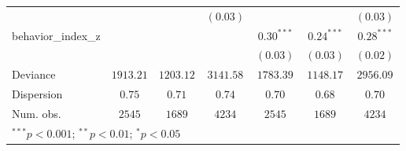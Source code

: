 \begin{tabular}{l c c c c c c}
                       &               &              & $(0.03)$      &               &              & $(0.03)$      \\
behavior\_index\_z     &               &              &               & $0.30^{***}$  & $0.24^{***}$ & $0.28^{***}$  \\
                       &               &              &               & $(0.03)$      & $(0.03)$     & $(0.02)$      \\
\midrule
Deviance               & $1913.21$     & $1203.12$    & $3141.58$     & $1783.39$     & $1148.17$    & $2956.09$     \\
Dispersion             & $0.75$        & $0.71$       & $0.74$        & $0.70$        & $0.68$       & $0.70$        \\
Num. obs.              & $2545$        & $1689$       & $4234$        & $2545$        & $1689$       & $4234$        \\
\bottomrule
\multicolumn{7}{l}{\scriptsize{$^{***}p<0.001$; $^{**}p<0.01$; $^{*}p<0.05$}}
\end{tabular}



